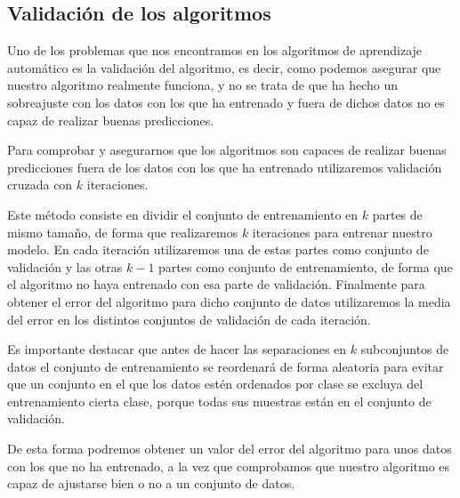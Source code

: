 \newpage

\subsection{Validación de los algoritmos}


Uno de los problemas que nos encontramos en los algoritmos de aprendizaje automático es la validación del algoritmo, es decir, como podemos asegurar que nuestro algoritmo realmente funciona, y no se trata de que ha hecho un sobreajuste con los datos con los que ha entrenado y fuera de dichos datos no es capaz de realizar buenas predicciones.

Para comprobar y asegurarnos que los algoritmos son capaces de realizar buenas predicciones fuera de los datos con los que ha entrenado utilizaremos validación cruzada con $k$ iteraciones.

Este método consiste en dividir el conjunto de entrenamiento en $k$ partes de mismo tamaño, de forma que realizaremos $k$ iteraciones para entrenar nuestro modelo. En cada iteración utilizaremos una de estas partes como conjunto de validación y las otras $k - 1$ partes como conjunto de entrenamiento, de forma que el algoritmo no haya entrenado con esa parte de validación. Finalmente para obtener el error del algoritmo para dicho conjunto de datos utilizaremos la media del error en los distintos conjuntos de validación de cada iteración.

Es importante destacar que antes de hacer las separaciones en $k$ subconjuntos de datos el conjunto de entrenamiento se reordenará de forma aleatoria para evitar que un conjunto en el que los datos estén ordenados por clase se excluya del entrenamiento cierta clase, porque todas sus muestras están en el conjunto de validación.

De esta forma podremos obtener un valor del error del algoritmo para unos datos con los que no ha entrenado, a la vez que comprobamos que nuestro algoritmo es capaz de ajustarse bien o no a un conjunto de datos.


